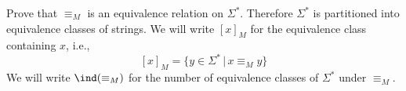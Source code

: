 Prove that $\equiv_M$ is an equivalence relation on $\Sigma^*$.
Therefore $\Sigma^*$ is partitioned into equivalence classes of
strings. We will write $[x]_M$ for the equivalence class containing
$x$, i.e.,
\[
 [x]_M = \{ y \in \Sigma^* \,|\, x \equiv_M y \}
\]
We will write $\ind(\equiv_M)$ for the number of equivalence classes
of $\Sigma^*$ under $\equiv_M$.
